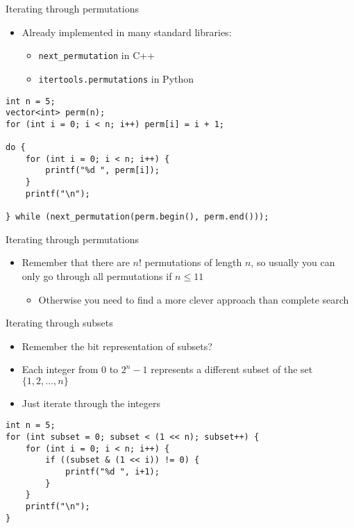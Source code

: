 \documentclass[12pt,t]{beamer}
\newcommand{\bi}{\begin{itemize}}
\newcommand{\ei}{\end{itemize}}
\begin{document}
\begin{frame}[fragile]{Iterating through permutations}
    \bi
        \item Already implemented in many standard libraries:
            \bi
                \item \texttt{next\_{}permutation} in C++
                \item \texttt{itertools.permutations} in Python
            \ei
    \ei

            \begin{verbatim}
int n = 5;
vector<int> perm(n);
for (int i = 0; i < n; i++) perm[i] = i + 1;

do {
    for (int i = 0; i < n; i++) {
        printf("%d ", perm[i]);
    }
    printf("\n");

} while (next_permutation(perm.begin(), perm.end()));
            \end{verbatim}

\end{frame}

\begin{frame}{Iterating through permutations}
    \vspace{40pt}

		\bi
       \vspace{20pt}
	   \item Remember that there are $n!$ permutations of length $n$, so usually you can only go through all permutations if $n \leq 11$
            \bi
                \item Otherwise you need to find a more clever approach than complete search
            \ei
           \vspace{20pt}
    \ei
\end{frame}


\begin{frame}[fragile]{Iterating through subsets}
    \bi
        \item Remember the bit representation of subsets?
        \item Each integer from $0$ to $2^n - 1$ represents a different subset of the set $\{1,2,\ldots,n\}$
        \item Just iterate through the integers
    \ei

            \begin{verbatim}
int n = 5;
for (int subset = 0; subset < (1 << n); subset++) {
    for (int i = 0; i < n; i++) {
        if ((subset & (1 << i)) != 0) {
            printf("%d ", i+1);
        }
    }
    printf("\n");
}
            \end{verbatim}
\end{frame}
\end{document}
